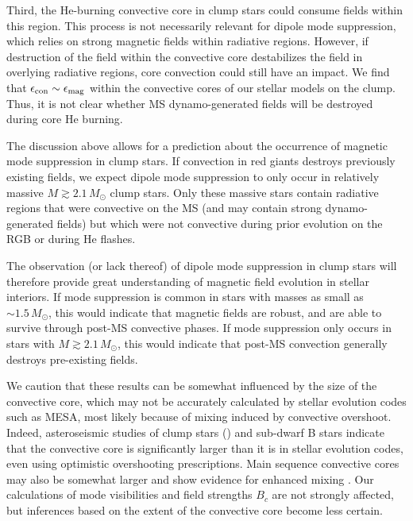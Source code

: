 Third, the He-burning convective core in clump stars could consume fields within this region. This process is not necessarily relevant for dipole mode suppression, which relies on strong magnetic fields within radiative regions. However, if destruction of the field within the convective core destabilizes the field in overlying radiative regions, core convection could still have an impact. We find that $\epsilon_{\rm con} \sim \epsilon_{\rm mag}$ within the convective cores of our stellar models on the clump. Thus, it is not clear whether MS dynamo-generated fields will be destroyed during core He burning. 

The discussion above allows for a prediction about the occurrence of magnetic mode suppression in clump stars. If convection in red giants destroys previously existing fields, we expect dipole mode suppression to only occur in relatively massive $M \gtrsim 2.1 \, M_\odot$ clump stars. Only these massive stars contain radiative regions that were convective on the MS (and may contain strong dynamo-generated fields) but which were not convective during prior evolution on the RGB or during He flashes. 

The observation (or lack thereof) of dipole mode suppression in clump stars will therefore provide great understanding of magnetic field evolution in stellar interiors. If mode suppression is common in stars with masses as small as $\sim \! 1.5 \, M_\odot$, this would indicate that magnetic fields are robust, and are able to survive through post-MS convective phases. If mode suppression only occurs in stars with $M \gtrsim 2.1 \, M_\odot$, this would indicate that post-MS convection generally destroys pre-existing fields. 

We caution that these results can be somewhat influenced by the size of the convective core, which may not be accurately calculated by stellar evolution codes such as MESA, most likely because of mixing induced by convective overshoot. Indeed, asteroseismic studies of clump stars (\cite{montalban_2013,stello_2013,mosser_2014,bossini_2015,constantino_2015}) and sub-dwarf B stars \citep{vangrootel_2010a,vangrootel_2010b,charpinet_2011,Schindler_2015} indicate that the convective core is significantly larger than it is in stellar evolution codes, even using optimistic overshooting prescriptions. Main sequence convective cores may also be somewhat larger and show evidence for enhanced mixing \citep{moravveji_2015}.  Our calculations of mode visibilities and field strengths $B_c$ are not strongly affected, but inferences based on the extent of the convective core become less certain.
    
    